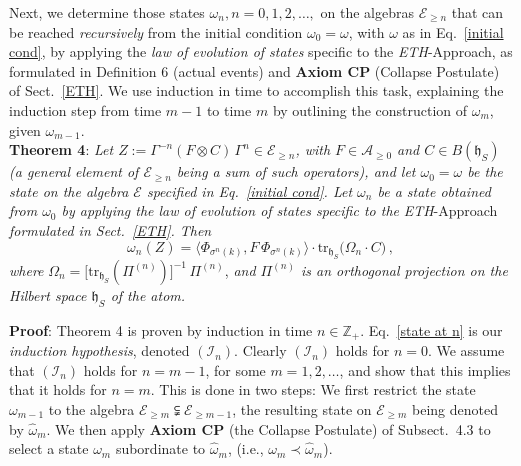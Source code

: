 \documentclass[12pt]{article}
\begin{document}
Next, we determine those states $\omega_n, n=0,1,2, \dots,$ on the algebras $\mathcal{E}_{\geq n}$ that can be
reached \textit{recursively} from the initial condition $\omega_0 = \omega$, with $\omega$ as in Eq.~\eqref{initial cond},
by applying the \textit{law of evolution of states} specific to the \textit{ETH}-Approach, as formulated in Definition 6
(actual events) and {\bf{Axiom CP}} (Collapse Postulate) of Sect.~\ref{ETH}. We use induction in time to accomplish this
task, explaining the induction step from time $m-1$ to time $m$ by outlining the construction of $\omega_m$, given
$\omega_{m-1}$. \\

{\bf{Theorem 4}}: \textit{Let $Z:= \Gamma^{-n}(F\otimes C)\,\Gamma^{n} \in \mathcal{E}_{\geq n}$, with
$F\in \mathcal{A}_{\geq 0}$ and $C\in B(\mathfrak{h}_S)$ (a general element of $\mathcal{E}_{\geq n}$ being a sum of such operators), and let $\omega_0 =\omega$ be the state on the algebra
$\mathcal{E}$ specified in Eq.~\eqref{initial cond}. Let $\omega_n$ be a state obtained from $\omega_0$ by applying
the law of evolution of states specific to the} \textit{ETH}-Approach \textit{formulated in Sect.~\ref{ETH}. Then}
\begin{equation}\label{state at n}
\omega_{n}(Z)= \langle \Phi_{\sigma^{n}({k})}, F \,\Phi_{\sigma^{n}({k})}\rangle
\cdot \text{tr}_{\mathfrak{h}_S}\big(\Omega_n \cdot C\big)\,,
\end{equation}
\textit{where} $\Omega_{n} = \big[\text{tr}_{\mathfrak{h}_S} (\Pi^{(n)})\big]^{-1} \,\Pi^{(n)}$, \textit{and $\Pi^{(n)}$
is an orthogonal projection on the Hilbert space $\mathfrak{h}_S$ of the atom.}

{\bf{Proof}}:
Theorem 4 is proven by induction in time $n\in \mathbb{Z}_{+}$. Eq.~\eqref{state at n} is our \textit{induction hypothesis}, denoted $(\mathcal{I}_{n})$.
Clearly $(\mathcal{I}_{n})$ holds for $n=0$. We assume that $(\mathcal{I}_{n})$ holds for $n=m-1$, for some $m=1,2,\dots$,
and show that this implies that it holds for $n=m$. This is done in two steps: We first restrict the state $\omega_{m-1}$
to the algebra $\mathcal{E}_{\geq m}\subsetneqq \mathcal{E}_{\geq m-1}$, the resulting state on $\mathcal{E}_{\geq m}$
being denoted by $\widehat{\omega}_m$. We then apply {\bf{Axiom CP}} (the Collapse Postulate) of Subsect.~4.3 to
select a state $\omega_m$ subordinate to $\widehat{\omega}_m$, (i.e., $\omega_m \prec \widehat{\omega}_m$).
\end{document}
